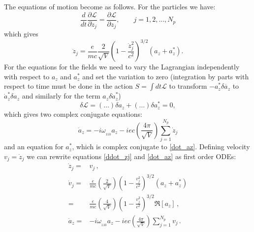\documentclass[11pt]{article}
\newcommand{\LL}{\mathcal{L}}
\begin{document}
The equations of motion become as follows. For the particles we have:
%
\begin{equation}
\frac{d}{dt}\frac{\partial\LL}{\partial \dot{z}_j} = \frac{\partial \LL}{\partial z_j}, \qquad j=1,2,\ldots, N_p \nonumber
\end{equation}
%
which gives
%
\begin{equation}
\ddot{z}_j = \frac{e}{mc}\frac{2}{\sqrt{V}}\left(1-\frac{\dot{z}_j^2}{c^2} \right)^{3/2} (a_z + a_z^*).
\label{ddot_zj}
\end{equation}
%
For the equations for the fields we need to vary the Lagrangian independently with respect to 
$a_z$ and $a_z^*$ and set the variation to zero 
(integration by parts with respect to time  must be done in the action $S=\int dt \LL$ to transform $-a_z^*\delta\dot{a_z}$
to $\dot{a}_z^*\delta a_z$ and similarly for the term $a_z\delta\dot{a}_z^*$)
%
\begin{equation}
\delta\LL = (\ldots)\delta a_z + (\ldots)\delta a_z^* = 0,
\end{equation}
%
which gives two complex conjugate equations:
\begin{equation}
\dot{a}_z = -i\omega_{_{110}}a_z - iec\left(\frac{4\pi}{\sqrt{V}}\right) \sum_{j=1}^{N_p} \dot{z}_j
\label{dot_az}
\end{equation}
%
and an equation for $a_z^*$, which is complex conjugate to \eqref{dot_az}.
%
Defining velocity $v_j = \dot{z}_j$ we can rewrite equations \eqref{ddot_zj} and \eqref{dot_az} 
as first order ODEs:
%
\begin{align}
\dot{z}_j =& v_j \label{dot_zj_110}\, , \\
\dot{v}_j =& \frac{e}{mc}\left(\frac{2}{\sqrt{V}}\right) \left(1-\frac{v_j^2}{c^2} \right)^{3/2} (a_z + a_z^*)
\nonumber\\
 =& \frac{e}{mc}\left(\frac{4}{\sqrt{V}}\right)\left(1-\frac{v_j^2}{c^2} \right)^{3/2}\Re[a_z]
\, ,\label{dot_vj_110} \\
\dot{a}_z =& -i\omega_{_{110}}a_z - iec \left(\frac{4\pi}{\sqrt{V}}\right) \sum_{j=1}^{N_p}v_j\, .
\label{dot_az_110}
\end{align}
%
\end{document}
